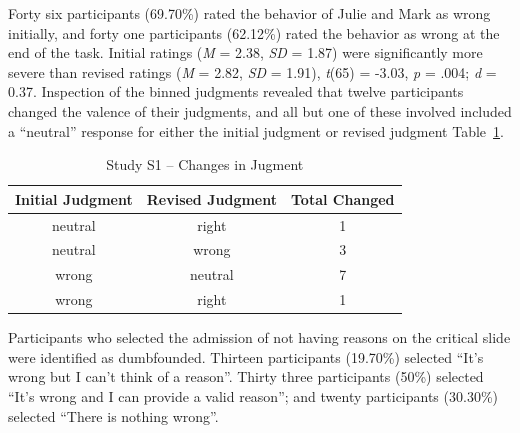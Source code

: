 \documentclass[
  man,floatsintext]{apa6}
\begin{document}
Forty six participants (69.70\%) rated the behavior of Julie and Mark as wrong initially, and forty one participants (62.12\%) rated the behavior as wrong at the end of the task. Initial ratings (\emph{M} = 2.38, \emph{SD} = 1.87) were significantly more severe than revised ratings (\emph{M} = 2.82, \emph{SD} = 1.91), \emph{t}(65) = -3.03, \emph{p} = .004; \emph{d} = 0.37. Inspection of the binned judgments revealed that twelve participants changed the valence of their judgments, and all but one of these involved included a ``neutral'' response for either the initial judgment or revised judgment Table~\ref{tab:tabS1change}.

\begin{table}[tbp]

\begin{center}
\begin{threeparttable}

\caption{\label{tab:tabS1change}Study S1 – Changes in Jugment}

\begin{tabular}{ccc}
\toprule
Initial Judgment & \multicolumn{1}{c}{Revised Judgment} & \multicolumn{1}{c}{Total Changed}\\
\midrule
neutral & right & 1\\
neutral & wrong & 3\\
wrong & neutral & 7\\
wrong & right & 1\\
\bottomrule
\end{tabular}

\end{threeparttable}
\end{center}

\end{table}

Participants who selected the admission of not having reasons on the critical slide were identified as dumbfounded. Thirteen participants (19.70\%) selected ``It's wrong but I can't think of a reason''. Thirty three participants (50\%) selected ``It's wrong and I can provide a valid reason''; and twenty participants (30.30\%) selected ``There is nothing wrong''.
\end{document}
